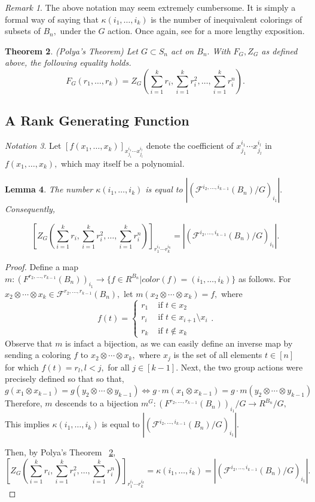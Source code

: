 \documentclass{amsart}
\newtheorem{thm}{Theorem}[subsection]
\newtheorem{lem}[thm]{Lemma}
\theoremstyle{remark}
\newtheorem{rem}[thm]{Remark}
\newtheorem{note}[thm]{Notation}
\newcommand\ssec{\subsection}
\renewcommand{\iff}{\Leftrightarrow}
\begin{document}
\begin{rem}
The above notation may seem extremely cumbersome. It is simply a formal way of saying that $\kappa(i_1,\ldots, i_k)$ is the number of inequivalent colorings of subsets of $B_n,$ under the $G$ action. Once again, see \cite[Chapter 7]{algebraic_stanley} for a more lengthy exposition.
\end{rem}

\begin{thm}
\label{thm:polya}
(Polya's Theorem)
Let $G \subset S_n$ act on $B_n.$ With $F_G,Z_G$ as defined above, the following equality holds.
$$F_G(r_1,\ldots, r_k) = Z_G(\sum_{i=1}^k r_i,\sum_{i=1}^k r_i^2,\ldots, \sum_{i=1}^k r_i^n).$$
\end{thm}


\ssec{A Rank Generating Function}


\begin{note}
Let $[f(x_1,\ldots, x_k)]_{x_{j_1}^{i_1}\cdots x_{j_l}^{i_l}}$ denote the coefficient of $x_{j_1}^{i_1}\cdots x_{j_l}^{i_l}$ in $f(x_1,\ldots, x_k),$ which may itself be a polynomial.
\end{note}

\begin{lem}
\label{lem:polya_faces_equivlence}
The number $\kappa(i_1,\ldots, i_k)$ is equal to $|(\mathcal F^{i_2,\ldots, i_{k-1}}(B_n)/G)_{i_1}|.$ Consequently, 

$$[Z_G(\sum_{i=1}^k r_i,\sum_{i=1}^k r_i^2,\ldots, \sum_{i=1}^k r_i^n)]_{r_1^{i_1} \cdots r_k^{i_k}}=|(\mathcal F^{i_2,\ldots, i_{k-1}}(B_n)/G)_{i_1}|.$$
\end{lem}
\begin{proof}
Define a map $m:(F^{r_2,\ldots, r_{k-1}}(B_n))_{i_1} \rightarrow \{f \in R^{B_n}|color(f) =(i_1,\ldots, i_k)\}$ as follows. For $x_2 \otimes\cdots\otimes x_{k} \in \mathcal F^{r_2,\ldots, r_{k-1}}(B_n),$ let $m(x_2 \otimes\cdots\otimes x_{k}) = f,$ where 
$$f(t) = \begin{cases} r_1 &\text{ if } t\in x_2\\
r_i &\text{ if } t \in x_{i+1}\setminus x_i\\
r_k &\text{ if } t \notin x_k
\end{cases}.$$
Observe that $m$ is infact a bijection, as we can easily define an inverse map by sending a coloring $f$ to $x_2\otimes\cdots\otimes x_{k},$ where $x_j$ is the set of all elements $t \in [n]$ for which $f(t) = r_l,l<j,$ for all $j \in [k-1].$ 
Next, the two group actions were precisely defined so that so that, 
$$g(x_1\otimes x_{k-1}) = g(y_2 \otimes \cdots \otimes y_{k-1}) \iff g\cdot m(x_1\otimes x_{k-1}) = g\cdot m(y_2 \otimes \cdots \otimes y_{k-1})$$
Therefore, $m$ descends to a bijection $m^G:(F^{r_2,\ldots, r_{k-1}}(B_n))_{i_1}/G \rightarrow R^{B_n}/G,$ This implies $\kappa(i_1,\ldots, i_k)$ is equal to $|(\mathcal F^{i_2,\ldots, i_{k-1}}(B_n)/G)_{i_1}|.$ 

Then, by Polya's Theorem ~\ref{thm:polya},  
$$[Z_G(\sum_{i=1}^k r_i,\sum_{i=1}^k r_i^2,\ldots, \sum_{i=1}^k r_i^n)]_{r_1^{i_1} \cdots r_k^{i_k}}=\kappa(i_1,\ldots, i_k)=|(\mathcal F^{i_2,\ldots, i_{k-1}}(B_n)/G)_{i_1}|.$$
\end{proof}
\end{document}
